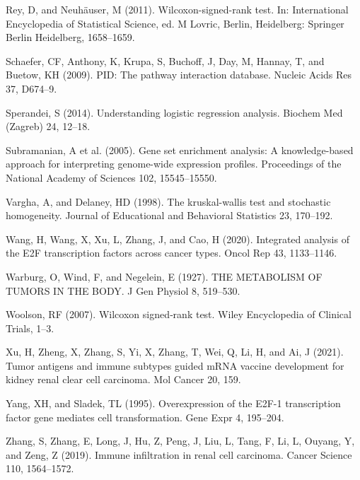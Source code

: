 \documentclass[
  parskip,
  oneside]{scrreprt}
\newlength{\cslhangindent}
\newlength{\cslentryspacingunit} %
\newenvironment{CSLReferences}[2] %
 {%
  \setlength{\parindent}{0pt}
  \ifodd #1
  \let\oldpar\par
  \def\par{\hangindent=\cslhangindent\oldpar}
  \fi
  \setlength{\parskip}{#2\cslentryspacingunit}
 }%
 {}
\begin{document}
\begin{CSLReferences}{0}{0}
\leavevmode{}%
Rey, D, and Neuhäuser, M (2011). Wilcoxon-signed-rank test. In:
International Encyclopedia of Statistical Science, ed. M Lovric, Berlin,
Heidelberg: Springer Berlin Heidelberg, 1658--1659.

\leavevmode{}%
Schaefer, CF, Anthony, K, Krupa, S, Buchoff, J, Day, M, Hannay, T, and
Buetow, KH (2009). PID: The pathway interaction database. Nucleic Acids
Res 37, D674--9.

\leavevmode{}%
Sperandei, S (2014). Understanding logistic regression analysis. Biochem
Med (Zagreb) 24, 12--18.

\leavevmode{}%
Subramanian, A et al. (2005). Gene set enrichment analysis: A
knowledge-based approach for interpreting genome-wide expression
profiles. Proceedings of the National Academy of Sciences 102,
15545--15550.

\leavevmode{}%
Vargha, A, and Delaney, HD (1998). The kruskal-wallis test and
stochastic homogeneity. Journal of Educational and Behavioral Statistics
23, 170--192.

\leavevmode{}%
Wang, H, Wang, X, Xu, L, Zhang, J, and Cao, H (2020). Integrated
analysis of the E2F transcription factors across cancer types. Oncol Rep
43, 1133--1146.

\leavevmode{}%
Warburg, O, Wind, F, and Negelein, E (1927). THE METABOLISM OF TUMORS IN
THE BODY. J Gen Physiol 8, 519--530.

\leavevmode{}%
Woolson, RF (2007). Wilcoxon signed‐rank test. Wiley Encyclopedia of
Clinical Trials, 1--3.

\leavevmode{}%
Xu, H, Zheng, X, Zhang, S, Yi, X, Zhang, T, Wei, Q, Li, H, and Ai, J
(2021). Tumor antigens and immune subtypes guided mRNA vaccine
development for kidney renal clear cell carcinoma. Mol Cancer 20, 159.

\leavevmode{}%
Yang, XH, and Sladek, TL (1995). Overexpression of the E2F-1
transcription factor gene mediates cell transformation. Gene Expr 4,
195--204.

\leavevmode{}%
Zhang, S, Zhang, E, Long, J, Hu, Z, Peng, J, Liu, L, Tang, F, Li, L,
Ouyang, Y, and Zeng, Z (2019). Immune infiltration in renal cell
carcinoma. Cancer Science 110, 1564--1572.


\end{CSLReferences}
\end{document}
